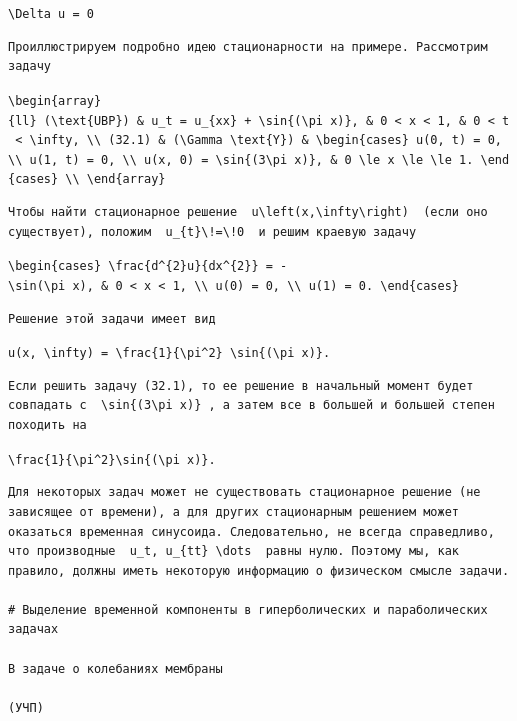 \documentclass[
  ukrainian,
]{article}
\begin{document}
\texttt{\textbackslash{}Delta\ u\ =\ 0}

\begin{verbatim}
Проиллюстрируем подробно идею стационарности на примере. Рассмотрим задачу
\end{verbatim}

\texttt{\textbackslash{}begin\{array\}\{ll\}\ (\textbackslash{}text\{UBP\})\ \&\ u\_t\ =\ u\_\{xx\}\ +\ \textbackslash{}sin\{(\textbackslash{}pi\ x)\},\ \&\ 0\ \textless{}\ x\ \textless{}\ 1,\ \&\ 0\ \textless{}\ t\ \textless{}\ \textbackslash{}infty,\ \textbackslash{}\textbackslash{}\ (32.1)\ \&\ (\textbackslash{}Gamma\ \textbackslash{}text\{Y\})\ \&\ \textbackslash{}begin\{cases\}\ u(0,\ t)\ =\ 0,\ \textbackslash{}\textbackslash{}\ u(1,\ t)\ =\ 0,\ \textbackslash{}\textbackslash{}\ u(x,\ 0)\ =\ \textbackslash{}sin\{(3\textbackslash{}pi\ x)\},\ \&\ 0\ \textbackslash{}le\ x\ \textbackslash{}le\ \textbackslash{}le\ 1.\ \textbackslash{}end\{cases\}\ \textbackslash{}\textbackslash{}\ \textbackslash{}end\{array\}}

\begin{verbatim}
Чтобы найти стационарное решение  u\left(x,\infty\right)  (если оно существует), положим  u_{t}\!=\!0  и решим краевую задачу
\end{verbatim}

\texttt{\textbackslash{}begin\{cases\}\ \textbackslash{}frac\{d\^{}\{2\}u\}\{dx\^{}\{2\}\}\ =\ -\textbackslash{}sin(\textbackslash{}pi\ x),\ \&\ 0\ \textless{}\ x\ \textless{}\ 1,\ \textbackslash{}\textbackslash{}\ u(0)\ =\ 0,\ \textbackslash{}\textbackslash{}\ u(1)\ =\ 0.\ \textbackslash{}end\{cases\}}

\begin{verbatim}
Решение этой задачи имеет вид
\end{verbatim}

\texttt{u(x,\ \textbackslash{}infty)\ =\ \textbackslash{}frac\{1\}\{\textbackslash{}pi\^{}2\}\ \textbackslash{}sin\{(\textbackslash{}pi\ x)\}.}

\begin{verbatim}
Если решить задачу (32.1), то ее решение в начальный момент будет совпадать с  \sin{(3\pi x)} , а затем все в большей и большей степен походить на
\end{verbatim}

\texttt{\textbackslash{}frac\{1\}\{\textbackslash{}pi\^{}2\}\textbackslash{}sin\{(\textbackslash{}pi\ x)\}.}

\begin{verbatim}
Для некоторых задач может не существовать стационарное решение (не зависящее от времени), а для других стационарным решением может оказаться временная синусоида. Следовательно, не всегда справедливо, что производные  u_t, u_{tt} \dots  равны нулю. Поэтому мы, как правило, должны иметь некоторую информацию о физическом смысле задачи.

# Выделение временной компоненты в гиперболических и параболических задачах

В задаче о колебаниях мембраны

(УЧП)
\end{verbatim}
\end{document}
